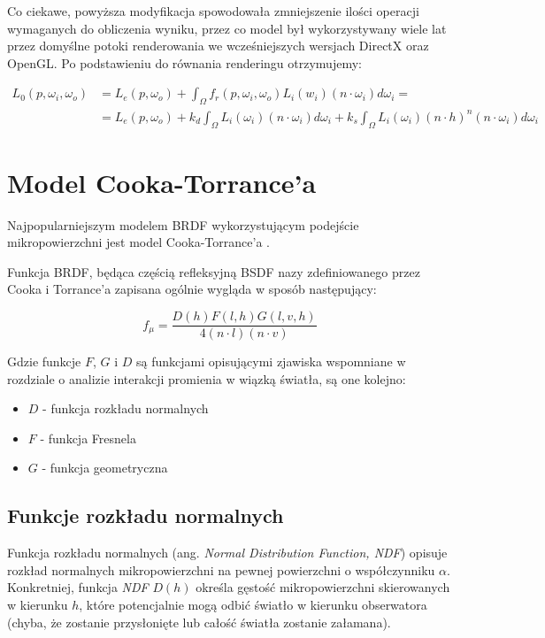 \documentclass[../main.tex]{subfiles}
\begin{document}
Co ciekawe, powyższa modyfikacja spowodowała zmniejszenie ilości operacji
wymaganych do obliczenia wyniku, przez co model był wykorzystywany wiele lat
przez domyślne potoki renderowania we wcześniejszych wersjach DirectX oraz
OpenGL. Po podstawieniu do równania renderingu otrzymujemy:

\begin{align*}
  L_0(p, \omega_i, \omega_o) &=
  L_{e}(p, \omega_o) +
  \int_{\Omega} {
    f_r(p, \omega_i, \omega_o)
    L_i(w_i)
    (n \cdot \omega_i)
    d \omega_i
  } = \\
  &= L_{e}(p, \omega_o) +
  k_d \int_{\Omega} {L_i(\omega_i) (n \cdot \omega_i) d\omega_i} +
  k_s \int_{\Omega} {L_i(\omega_i) (n \cdot h)^{n} (n \cdot \omega_i) d\omega_i}
\end{align*}

\section{Model Cooka-Torrance'a}

Najpopularniejszym modelem BRDF wykorzystującym podejście mikropowierzchni jest
model Cooka-Torrance'a \cite{CookTorrance}.

Funkcja BRDF, będąca częścią refleksyjną BSDF nazy zdefiniowanego przez Cooka i
Torrance'a zapisana ogólnie wygląda w sposób następujący:

\begin{displaymath}
  f_{\mu} = \frac{
    D(h) F(l,h) G(l,v,h)
  }{
    4 (n \cdot l) (n \cdot v)
  }
\end{displaymath}

Gdzie funkcje $F$, $G$ i $D$ są funkcjami opisującymi zjawiska wspomniane
w rozdziale o analizie interakcji promienia w wiązką światła, są one kolejno:

\begin{itemize}
  \item $D$ - funkcja rozkładu normalnych
  \item $F$ - funkcja Fresnela
  \item $G$ - funkcja geometryczna
\end{itemize}

\subsection{Funkcje rozkładu normalnych}

Funkcja rozkładu normalnych (ang. \textit{Normal Distribution Function, NDF})
opisuje rozkład normalnych mikropowierzchni na pewnej powierzchni o
współczynniku $\alpha$. Konkretniej, funkcja \textit{NDF} $D(h)$ określa
gęstość mikropowierzchni skierowanych w kierunku $h$, które potencjalnie mogą
odbić światło w kierunku obserwatora (chyba, że zostanie przysłonięte lub
całość światła zostanie załamana).
\end{document}
